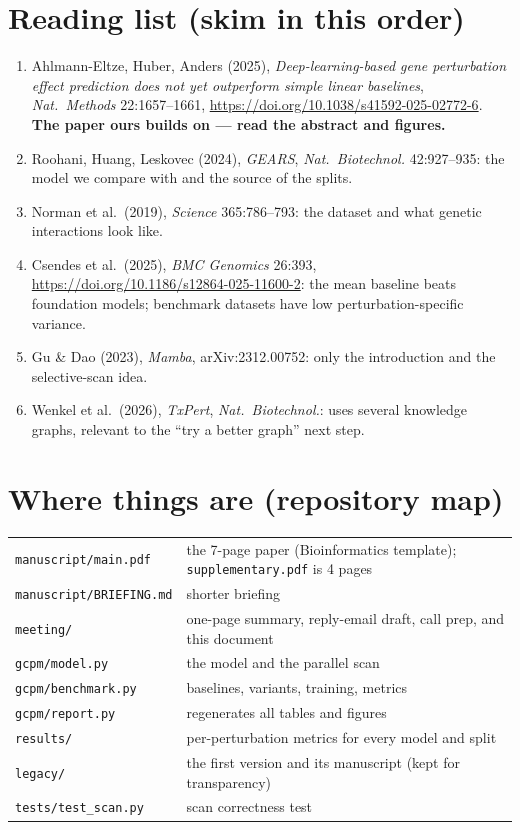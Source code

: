\documentclass[10.5pt]{article}
\begin{document}
\section{Reading list (skim in this order)}
\begin{enumerate}
\item Ahlmann-Eltze, Huber, Anders (2025), \emph{Deep-learning-based gene perturbation effect prediction does
not yet outperform simple linear baselines}, \emph{Nat.\ Methods} 22:1657--1661,
\url{https://doi.org/10.1038/s41592-025-02772-6}. \textbf{The paper ours builds on --- read the abstract and
figures.}
\item Roohani, Huang, Leskovec (2024), \emph{GEARS}, \emph{Nat.\ Biotechnol.} 42:927--935: the model we compare with
and the source of the splits.
\item Norman et al.\ (2019), \emph{Science} 365:786--793: the dataset and what genetic interactions look like.
\item Csendes et al.\ (2025), \emph{BMC Genomics} 26:393, \url{https://doi.org/10.1186/s12864-025-11600-2}: the mean
baseline beats foundation models; benchmark datasets have low perturbation-specific variance.
\item Gu \& Dao (2023), \emph{Mamba}, arXiv:2312.00752: only the introduction and the selective-scan idea.
\item Wenkel et al.\ (2026), \emph{TxPert}, \emph{Nat.\ Biotechnol.}: uses several knowledge graphs, relevant to the
``try a better graph'' next step.
\end{enumerate}

\section{Where things are (repository map)}
\begin{tabular}{@{}p{5.4cm}p{10.1cm}@{}}
\toprule
\texttt{manuscript/main.pdf} & the 7-page paper (Bioinformatics template); \texttt{supplementary.pdf} is 4 pages\\
\texttt{manuscript/BRIEFING.md} & shorter briefing\\
\texttt{meeting/} & one-page summary, reply-email draft, call prep, and this document\\
\texttt{gcpm/model.py} & the model and the parallel scan\\
\texttt{gcpm/benchmark.py} & baselines, variants, training, metrics\\
\texttt{gcpm/report.py} & regenerates all tables and figures\\
\texttt{results/} & per-perturbation metrics for every model and split\\
\texttt{legacy/} & the first version and its manuscript (kept for transparency)\\
\texttt{tests/test\_scan.py} & scan correctness test\\
\bottomrule
\end{tabular}
\end{document}
